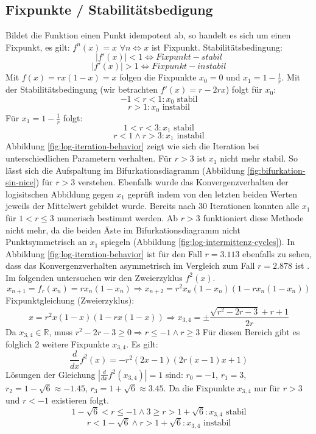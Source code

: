 \documentclass{scrartcl}
\begin{document}
\subsection{Fixpunkte / Stabilitätsbedigung}
Bildet die Funktion einen Punkt idempotent ab, so handelt es sich um einen Fixpunkt, es gilt: $f^n(x)=x$ $\forall n \iff x$ ist Fixpunkt. 
Stabilitätsbedingung:
\begin{equation} |f'(x)|<1 \iff Fixpunkt-stabil \end{equation}
\begin{equation} |f'(x)|>1 \iff Fixpunkt-instabil \end{equation}
Mit $ f(x)=rx(1-x)=x $ folgen die Fixpunkte $x_{0}=0$ und $x_{1}=1-\frac{1}{r}$. Mit der Stabilitätsbedingung (wir betrachten $f'(x)=r-2rx$) folgt für $x_{0}$:
$$-1 < r < 1: x_{0} \text{ stabil}$$
$$r > 1: x_{0} \text{ instabil}$$
Für $x_{1}=1-\frac{1}{r}$ folgt:
$$1 < r < 3: x_1 \text{ stabil}$$
$$r<1 \wedge  r> 3: x_1 \text{ instabil}$$
Abbildung \ref{fig:log-iteration-behavior} zeigt wie sich die Iteration bei unterschiedlichen Parametern verhalten. Für $r>3$ ist $x_1$ nicht mehr stabil. So lässt sich die Aufspaltung im Bifurkationsdiagramm (Abbildung \ref{fig:bifurkation-sin-nice}) für $r>3$ verstehen. Ebenfalls wurde das Konvergenzverhalten der logisitschen Abbildung gegen $x_1$ geprüft indem von den letzten beiden Werten jeweils der Mittelwert gebildet wurde. Bereits nach 30 Iterationen konnten alle $x_1$ für $1 < r \leq 3$ numerisch bestimmt werden. Ab $r>3$ funktioniert diese Methode nicht mehr, da die beiden Äste im Bifurkationsdiagramm nicht Punktsymmetrisch an $x_1$ spiegeln (Abbildung \ref{fig:log-intermittenz-cycles}). In Abbildung \ref{fig:log-iteration-behavior} ist für den Fall $r=3.113$ ebenfalls zu sehen, dass das Konvergenzverhalten asymmetrisch im Vergleich zum Fall $r=2.878$ ist .
Im folgenden untersuchen wir den Zweierzyklus $f^2(x)$.
\begin{equation}x_{n+1}=f_r(x_n)=rx_n(1-x_n)
\Rightarrow x_{n+2}=r^2x_n(1-x_n)(1-rx_n(1-x_n))\end{equation}
\newline
Fixpunktgleichung (Zweierzyklus):
\begin{equation}
x=r^2x(1-x)(1-rx(1-x))
\Rightarrow 
x_{3,4}=\pm\frac{\sqrt{r^2-2 r-3}+r+1}{2 r}
\end{equation}
Da $x_{3,4} \in \mathbb{R} $, muss $r^2-2 r-3 \geq 0 \Rightarrow r \leq -1 \land r \geq 3$
Für diesen Bereich gibt es folglich 2 weitere Fixpunkte $x_{3,4}$. 
Es gilt:
\begin{equation}
\frac{d}{dx}f^2(x)=-r^2(2x-1)(2r(x-1)x+1)
\end{equation}
Lösungen der Gleichung $|\frac{d}{dx}f^2(x_{3,4})|=1$ sind: $r_0=-1$, $r_1=3$, $r_2=1-\sqrt{6}\approx-1.45$, $r_3=1+\sqrt{6}\approx3.45$. Da die Fixpunkte $x_{3,4}$ nur für $r>3$ und $r<-1$ existieren folgt.
\begin{equation}1-\sqrt{6}< r \leq -1 \wedge 3 \geq r > 1+\sqrt{6}: x_{3,4} \text{ stabil}
\end{equation}
\begin{equation}r < 1-\sqrt{6} \wedge r>1+\sqrt{6}: x_{3,4} \text{ instabil}
\end{equation}
\end{document}
